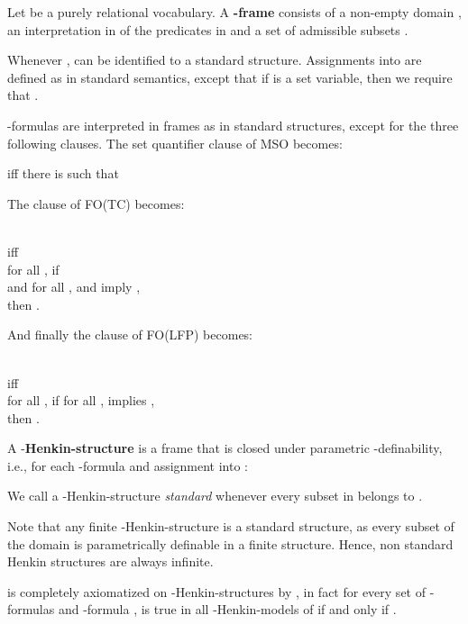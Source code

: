 \documentclass{LMCS}
\newcommand{\mso}{\textsf{MSO}\xspace}
\newcommand{\fotc}{\textsf{FO(TC)}\xspace}
\newcommand{\folfp}{\textsf{FO(LFP)}\xspace}
\newcommand{\finremark}{\hfill}
\begin{document}
\begin{defi}
[Frames]
    Let  be a purely relational vocabulary. A \textbf{-frame}  consists of a non-empty domain
    , an interpretation in  of the predicates in  and a set of admissible subsets .
\end{defi}
Whenever ,  can be identified to a standard structure. Assignments  into  are defined as in standard semantics, except that if  is a set variable, then we require that .
\begin{defi}
-formulas are interpreted in frames as in standard structures, except for the three following clauses. The set quantifier clause of \mso becomes:
\begin{center}
 iff there is  such that 
\end{center}
The  clause of \fotc becomes:
\begin{center}
\\
iff\\
for all , if \\
and for all ,  and  imply
,\\
then .
\end{center}

And finally the  clause of \folfp becomes:
\begin{center}
\\
iff\\
for all , if for all ,  implies ,\\
then .
\end{center}
\label{hensem}
\end{defi}

\begin{defi}
    A -\textbf{Henkin-structure} is a frame  that is closed
    under parametric -definability, i.e., for each -formula
     and assignment  into :
\begin{center}

\end{center}
We call a -Henkin-structure  \emph{standard} whenever
every subset in  belongs to . 
\end{defi}

\begin{rem}
Note that any finite -Henkin-structure is a standard
structure, as every subset of the domain is parametrically
definable in a finite structure. Hence, non standard Henkin structures are
always infinite.
\label{rem}
\finremark
\end{rem}


\begin{thm}
 is completely axiomatized on -Henkin-structures
by , in fact for every set of -formulas
 and -formula ,  is true in all
-Henkin-models of  if and only if . \label{hencomp}
\end{thm}
\end{document}
